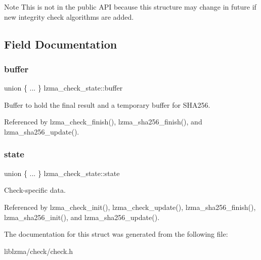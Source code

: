 \begin{DoxyNote}{Note}
This is not in the public A\+PI because this structure may change in future if new integrity check algorithms are added. 
\end{DoxyNote}


\subsection{Field Documentation}
\mbox{\label{structlzma__check__state_a66d54715269b349088561ee800cd2356}} 
\subsubsection{buffer}
{\footnotesize\ttfamily union \{ ... \}   lzma\+\_\+check\+\_\+state\+::buffer}



Buffer to hold the final result and a temporary buffer for S\+H\+A256. 



Referenced by lzma\+\_\+check\+\_\+finish(), lzma\+\_\+sha256\+\_\+finish(), and lzma\+\_\+sha256\+\_\+update().

\mbox{\label{structlzma__check__state_af30e2332a697d110c3fb2e4aa6b99178}} 
\subsubsection{state}
{\footnotesize\ttfamily union \{ ... \}   lzma\+\_\+check\+\_\+state\+::state}



Check-\/specific data. 



Referenced by lzma\+\_\+check\+\_\+init(), lzma\+\_\+check\+\_\+update(), lzma\+\_\+sha256\+\_\+finish(), lzma\+\_\+sha256\+\_\+init(), and lzma\+\_\+sha256\+\_\+update().



The documentation for this struct was generated from the following file\+:\begin{DoxyCompactItemize}
\item 
liblzma/check/check.\+h\end{DoxyCompactItemize}

